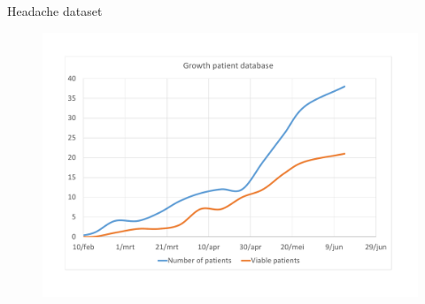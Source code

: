 \documentclass[english]{beamer}
\begin{document}
\begin{frame} {Headache dataset}
	\vspace{-2.5em}
	\begin{figure}
		\centering
		\includegraphics[width=\textwidth]{figures/chart_patients.pdf}
	\end{figure}
	
\end{frame}
\end{document}
